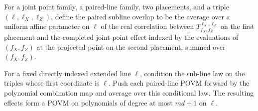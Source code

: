 \begin{definition}
	\label{def:paired-subline-overlap}
	\leanok
	For a joint point family, a paired-line family, two placements, and a triple
	$(\ell,\ell_X,\ell_Z)$, define the paired subline overlap to be the
	average over a uniform affine parameter on $\ell$ of the real correlation
	between $T^{\ell_X,\ell_Z}_{f_X,f_Z}$ on the first placement and the completed
	joint point effect indexed by the evaluations of $(f_X,f_Z)$ at the projected
	point on the second placement, summed over $(f_X,f_Z)$.
\end{definition}

\begin{definition}
	\label{def:extended-line-measurement}
	\leanok
	For a fixed directly indexed extended line $\ell$, condition the sub-line law
	on the triples whose first coordinate is $\ell$. Push each paired-line POVM
	forward by the polynomial combination map and average over this conditional
	law. The resulting effects form a POVM on polynomials of degree at most
	$md+1$ on $\ell$.
\end{definition}

